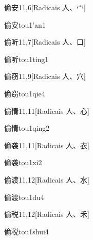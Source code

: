 \begin{entry}{偷安}{11,6}[Radicais ⼈、⼧]
  \begin{phonetics}{偷安}{tou1'an1}
  \end{phonetics}
\end{entry}

\begin{entry}{偷听}{11,7}[Radicais ⼈、⼝]
  \begin{phonetics}{偷听}{tou1ting1}
  \end{phonetics}
\end{entry}

\begin{entry}{偷窃}{11,9}[Radicais ⼈、⽳]
  \begin{phonetics}{偷窃}{tou1qie4}
  \end{phonetics}
\end{entry}

\begin{entry}{偷情}{11,11}[Radicais ⼈、⼼]
  \begin{phonetics}{偷情}{tou1qing2}
  \end{phonetics}
\end{entry}

\begin{entry}{偷袭}{11,11}[Radicais ⼈、⾐]
  \begin{phonetics}{偷袭}{tou1xi2}
  \end{phonetics}
\end{entry}

\begin{entry}{偷渡}{11,12}[Radicais ⼈、⽔]
  \begin{phonetics}{偷渡}{tou1du4}
  \end{phonetics}
\end{entry}

\begin{entry}{偷税}{11,12}[Radicais ⼈、⽲]
  \begin{phonetics}{偷税}{tou1shui4}
  \end{phonetics}
\end{entry}

